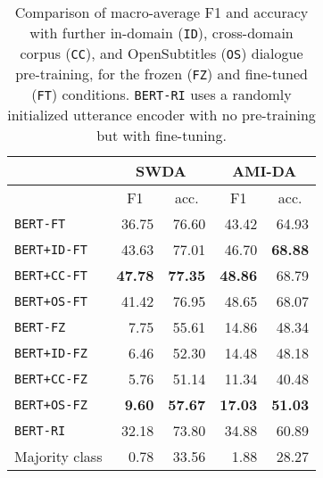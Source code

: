 \documentclass[11pt,a4paper]{article}
\begin{document}
\begin{table}[]
\begin{tabular}{@{}lrrrr@{}}
\toprule
           & \multicolumn{2}{c}{SWDA}                          & \multicolumn{2}{c}{AMI-DA}                        \\ \midrule
           & \multicolumn{1}{c}{F1} & \multicolumn{1}{c}{acc.} & \multicolumn{1}{c}{F1} & \multicolumn{1}{c}{acc.} \\
\texttt{BERT-FT}    & 36.75                  & 76.60                    & 43.42                  & 64.93                    \\
\texttt{BERT+ID-FT} & 43.63                  & 77.01                    & 46.70                  & \textbf{68.88}           \\
\texttt{BERT+CC-FT} & \textbf{47.78}         & \textbf{77.35}           & \textbf{48.86}         & 68.79                    \\ 
\texttt{BERT+OS-FT} & 41.42                  & 76.95                    & 48.65                  & 68.07                    \\ \midrule
\texttt{BERT-FZ}    &  7.75                  & 55.61           & 14.86                  & 48.34                    \\
\texttt{BERT+ID-FZ} &  6.46                  & 52.30                    & 14.48                  & 48.18                    \\
\texttt{BERT+CC-FZ} &  5.76                  & 51.14                    & 11.34                  & 40.48                    \\ 
\texttt{BERT+OS-FZ} &  \textbf{9.60}         & \textbf{57.67}           & \textbf{17.03}         & \textbf{51.03}           \\ \midrule
\texttt{BERT-RI} & 32.18           & 73.80                    & 34.88                  & 60.89                    \\ \midrule
    Majority class  & 0.78                   & 33.56                    &  1.88                  & 28.27      \\ \bottomrule
\end{tabular}
\caption{Comparison of macro-average F1 and accuracy with further in-domain (\texttt{ID}), cross-domain corpus (\texttt{CC}), and OpenSubtitles (\texttt{OS}) dialogue pre-training,
for the frozen (\texttt{FZ}) and fine-tuned (\texttt{FT}) conditions. \texttt{BERT-RI} uses a randomly initialized utterance encoder with no pre-training but with fine-tuning.}
  \label{tab:results}
\end{table}
\end{document}
